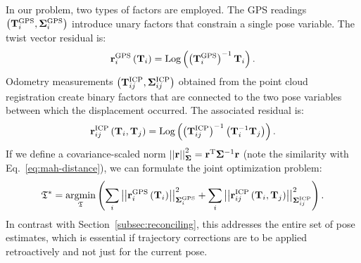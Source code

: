\newcommand{\tigps}{\pose_i^{\text{GPS}}}
\newcommand{\tijicp}{\pose_{ij}^{\text{ICP}}}
\newcommand{\covigps}{\matx{\Sigma}_i^{\text{GPS}}}
\newcommand{\covijicp}{\matx{\Sigma}_{ij}^{\text{ICP}}}
In our problem, two types of factors are employed. The GPS readings $\left(\tigps, \covigps\right)$ introduce unary factors that constrain a single pose variable. The twist vector residual is:
\begin{equation}
	\vecx{r}_i^{\text{GPS}}\left(\pose_i\right) =
	\Logmap{\left(\tigps\right)^{-1}\pose_i}
	\eqdot
\end{equation}
Odometry measurements $\left(\tijicp, \covijicp\right)$ obtained from the point cloud registration create binary factors that are connected to the two pose variables between which the displacement occurred. The associated residual is:
\begin{equation}
	\vecx{r}_{ij}^{\text{ICP}}\left(\pose_i, \pose_j\right) =
	\Logmap{\left(\tijicp \right)^{-1} \left(\pose_i^{-1} \pose_j\right)}
	\eqdot
\end{equation}
If we define a covariance-scaled norm $
	\left|\left|{\mathbf{r}}\right|\right|_{\mathbf{\Sigma}}^2 =
	{\mathbf{r}}^\text{T}\mathbf{\Sigma}^{-1}\mathbf{r}
$ (note the similarity with Eq.~\ref{eq:mah-distance}), we can formulate the joint optimization problem:
\begin{equation}
	\mathfrak{T}^{*} = \underset{\mathfrak{T}}{\text{argmin}}
	\left(
	\sum_{i} \normm{\vecx{r}_i^{\text{GPS}}\left(\pose_i\right)}_{\covigps}^2
	+
	\sum_{i} \normm{\vecx{r}_{ij}^{\text{ICP}}\left(\pose_i, \pose_j\right)}_{\covijicp}^2
	\right)
	\eqdot
\end{equation}
In contrast with Section~\ref{subsec:reconciling}, this addresses the entire set of pose estimates, which is essential if trajectory corrections are to be applied retroactively and not just for the current pose.

